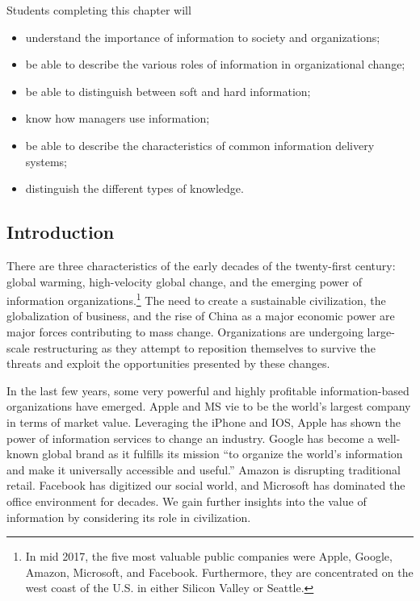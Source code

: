 \documentclass[
]{article}
\begin{document}
Students completing this chapter will

\begin{itemize}
\item
  understand the importance of information to society and
  organizations;
\item
  be able to describe the various roles of information in
  organizational change;
\item
  be able to distinguish between soft and hard information;
\item
  know how managers use information;
\item
  be able to describe the characteristics of common information
  delivery systems;
\item
  distinguish the different types of knowledge.
\end{itemize}

\hypertarget{introduction-1}{%
\subsection*{Introduction}\label{introduction-1}}

There are three characteristics of the early decades of the twenty-first
century: global warming, high-velocity global change, and the emerging
power of information organizations.\footnote{In mid 2017, the five most valuable public companies were Apple,
  Google, Amazon, Microsoft, and Facebook. Furthermore, they are
  concentrated on the west coast of the U.S. in either Silicon Valley
  or Seattle.} The need to create a sustainable
civilization, the globalization of business, and the rise of China as a
major economic power are major forces contributing to mass change.
Organizations are undergoing large-scale restructuring as they attempt
to reposition themselves to survive the threats and exploit the
opportunities presented by these changes.

In the last few years, some very powerful and highly profitable
information-based organizations have emerged. Apple and MS vie to be the
world's largest company in terms of market value. Leveraging the iPhone
and IOS, Apple has shown the power of information services to change an
industry. Google has become a well-known global brand as it fulfills its
mission ``to organize the world's information and make it universally
accessible and useful.'' Amazon is disrupting traditional retail.
Facebook has digitized our social world, and Microsoft has dominated the
office environment for decades. We gain further insights into the value
of information by considering its role in civilization.
\end{document}
